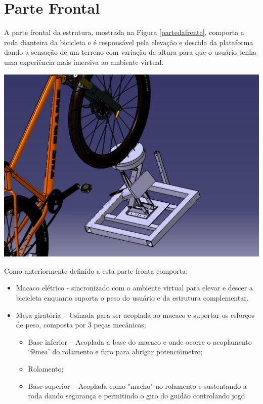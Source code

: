 \section{Parte Frontal} 

A parte frontal da estrutura, mostrada na Figura \ref{partedafrente}, comporta a roda dianteira da bicicleta e é responsável pela elevação e descida da plataforma dando a sensação de um terreno com variação de altura para que o usuário tenha uma experiência mais imersiva ao ambiente virtual.

    \begin{center}
    	\includegraphics[scale=0.4]{figuras/partedafrente.png}
        \label{partedafrente}
    \end{center}
    

    Como anteriormente definido a esta parte fronta comporta:
    \begin{itemize}
        \item Macaco elétrico - sincronizado com o ambiente virtual para elevar e descer a bicicleta enquanto suporta o peso do usuário e da estrutura complementar.

        \item Mesa giratória – Usinada para ser acoplada ao macaco e suportar os esforços de peso, composta por 3 peças mecânicas;
            \begin{itemize}
                \item Base inferior – Acoplada a base do macaco e onde ocorre o acoplamento ‘fêmea’ do rolamento e furo para abrigar potenciômetro;
                \item Rolamento;
                \item Base superior – Acoplada como "macho" no rolamento e sustentando a roda dando segurança e permitindo o giro do guidão controlando jogo
            \end{itemize}
    \end{itemize}    


